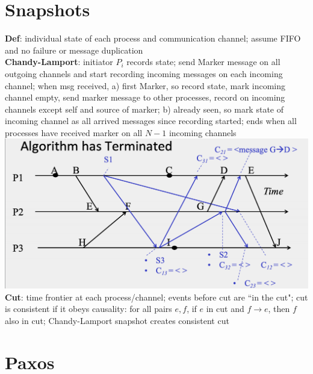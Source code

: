 \documentclass{article}
\begin{document}
\begin{multicols*}{3}
\section{Snapshots}
\textbf{Def}: individual state of each process and communication channel; assume FIFO and no failure or message duplication \\
\textbf{Chandy-Lamport}: initiator $P_i$ records state; send Marker message on all outgoing channels and start recording incoming messages on each incoming channel; when msg received, a) first Marker, so record state, mark incoming channel empty, send marker message to other processes, record on incoming channels except self and source of marker; b) already seen, so mark state of incoming channel as all arrived messages since recording started; ends when all processes have received marker on all $N-1$ incoming channels \\
\includegraphics[width=\columnwidth]{chandylamport.png}
\textbf{Cut}: time frontier at each process/channel; events before cut are ``in the cut"; cut is consistent if it obeys causality: for all pairs $e,f$, if $e$ in cut and $f \rightarrow e$, then $f$ also in cut; Chandy-Lamport snapshot creates consistent cut \\

\section{Paxos}


\end{multicols*}
\end{document}
